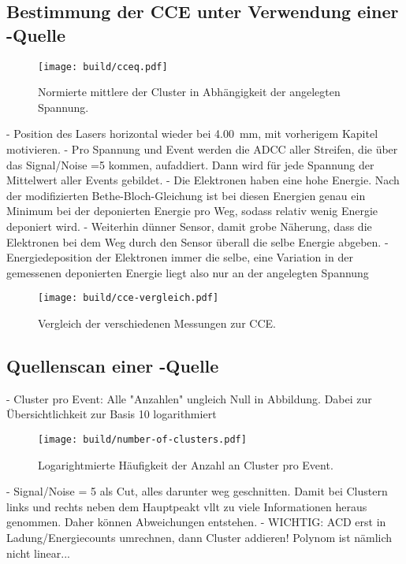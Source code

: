 \FloatBarrier
\subsection{Bestimmung der CCE unter Verwendung einer \texorpdfstring{}{Sr}-Quelle}
\label{sec:CCEQ-Auswertung}

\begin{figure}
  \centering
  \texttt{[image: build/cceq.pdf]}  %
  \caption{Normierte mittlere \si{\adc} der Cluster in Abhängigkeit der angelegten Spannung.}
  \label{fig:cceq}
\end{figure}
- Position des Lasers horizontal wieder bei \SI{4.00}{\milli\meter}, mit vorherigem
Kapitel motivieren.
- Pro Spannung und Event werden die ADCC aller Streifen, die über das Signal/Noise =5
kommen, aufaddiert. Dann wird für jede Spannung der Mittelwert aller Events gebildet.
- Die Elektronen haben eine hohe Energie. Nach der modifizierten Bethe-Bloch-Gleichung
ist bei diesen Energien genau ein Minimum bei der deponierten Energie pro Weg, sodass
relativ wenig Energie deponiert wird.
- Weiterhin dünner Sensor, damit grobe Näherung, dass die Elektronen bei dem Weg durch
den Sensor überall die selbe Energie abgeben.
- Energiedeposition der Elektronen immer die selbe, eine Variation in der gemessenen
deponierten Energie liegt also nur an der angelegten Spannung
\begin{figure}
  \centering
  \texttt{[image: build/cce-vergleich.pdf]}  %
  \caption{Vergleich der verschiedenen Messungen zur CCE.}
  \label{fig:cce-vergleich}
\end{figure}

\FloatBarrier
\subsection{Quellenscan einer \texorpdfstring{}{Sr}-Quelle}
\label{sec:Quellenscan-Auswertung}

- Cluster pro Event: Alle "Anzahlen" ungleich Null in Abbildung.
Dabei zur Übersichtlichkeit zur Basis 10 logarithmiert
\begin{figure}
  \centering
  \texttt{[image: build/number-of-clusters.pdf]}  %
  \caption{Logarightmierte Häufigkeit der Anzahl an Cluster pro Event.}
  \label{fig:number-of-clusters}
\end{figure}
- Signal/Noise = 5 als Cut, alles darunter weg geschnitten. Damit bei Clustern
links und rechts neben dem Hauptpeakt vllt zu viele Informationen heraus genommen.
Daher können Abweichungen entstehen.
- WICHTIG: ACD erst in Ladung/Energiecounts umrechnen, dann Cluster addieren!
Polynom ist nämlich nicht linear...
